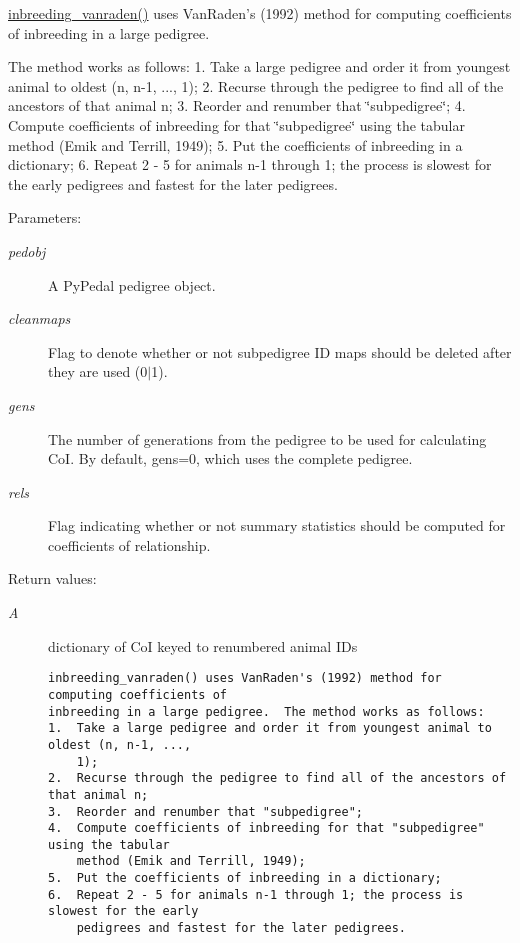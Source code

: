 \hyperlink{namespacePyPedal_1_1pyp__nrm_577fd15845cca08988029a7ccf7f68e4}{inbreeding\_\-vanraden()} uses Van\-Raden's (1992) method for computing coefficients of inbreeding in a large pedigree. 

The method works as follows: 1. Take a large pedigree and order it from youngest animal to oldest (n, n-1, ..., 1); 2. Recurse through the pedigree to find all of the ancestors of that animal n; 3. Reorder and renumber that \char`\"{}subpedigree\char`\"{}; 4. Compute coefficients of inbreeding for that \char`\"{}subpedigree\char`\"{} using the tabular method (Emik and Terrill, 1949); 5. Put the coefficients of inbreeding in a dictionary; 6. Repeat 2 - 5 for animals n-1 through 1; the process is slowest for the early pedigrees and fastest for the later pedigrees. \begin{Desc}
\item[Parameters:]
\begin{description}
\item[{\em pedobj}]A Py\-Pedal pedigree object. \item[{\em cleanmaps}]Flag to denote whether or not subpedigree ID maps should be deleted after they are used (0$|$1). \item[{\em gens}]The number of generations from the pedigree to be used for calculating Co\-I. By default, gens=0, which uses the complete pedigree. \item[{\em rels}]Flag indicating whether or not summary statistics should be computed for coefficients of relationship. \end{description}
\end{Desc}
\begin{Desc}
\item[Return values:]
\begin{description}
\item[{\em A}]dictionary of Co\-I keyed to renumbered animal IDs

\footnotesize\begin{verbatim}inbreeding_vanraden() uses VanRaden's (1992) method for computing coefficients of
inbreeding in a large pedigree.  The method works as follows:
1.  Take a large pedigree and order it from youngest animal to oldest (n, n-1, ...,
    1);
2.  Recurse through the pedigree to find all of the ancestors of that animal n;
3.  Reorder and renumber that "subpedigree";
4.  Compute coefficients of inbreeding for that "subpedigree" using the tabular
    method (Emik and Terrill, 1949);
5.  Put the coefficients of inbreeding in a dictionary;
6.  Repeat 2 - 5 for animals n-1 through 1; the process is slowest for the early
    pedigrees and fastest for the later pedigrees.
\end{verbatim}
\normalsize
 \end{description}
\end{Desc}


